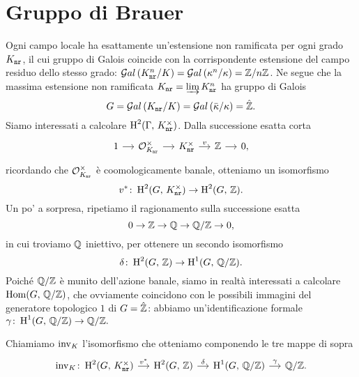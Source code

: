 \section{Gruppo di Brauer}
Ogni campo locale ha esattamente un'estensione non ramificata per ogni grado $ K_\mathtt{nr} $, il cui gruppo di Galois coincide con la corrispondente estensione del campo residuo dello stesso grado: $ \mathcal{G}al\left( K^n_\texttt{nr} / K \right) = \mathcal{G}al\left( \kappa^n / \kappa \right) = \mathbb{Z} / n\mathbb{Z} $. Ne segue che la massima estensione non ramificata $ K_\mathtt{nr} = \varinjlim K^n_\texttt{nr} $ ha gruppo di Galois
\[ G = \mathcal{G}al\left( K_\mathtt{nr} / K \right) = \mathcal{G}al\left( \bar{\kappa} / \kappa \right) = \hat{\mathbb{Z}}. \]
Siamo interessati a calcolare $ \operatorname{H}^2(\Gamma, \, K_\mathtt{nr}^\times) $. Dalla successione esatta corta
\[ \begin{tikzcd}[column sep = small]
1 \rar
& \mathcal{O}_{\knr}^\times \rar
& \knr^\times \rar["v"]
& \Z \rar
& 0,
\end{tikzcd} \]
ricordando che $ \mathcal{O}_{K_\mathtt{nr}}^\times $ è coomologicamente banale, otteniamo un isomorfismo
\[ v^* \colon \operatorname{H}^2(G, \, K_\mathtt{nr}^\times) \to \operatorname{H}^2(G, \, \mathbb{Z}). \]
Un po' a sorpresa, ripetiamo il ragionamento sulla successione esatta
\[ 0 \to \mathbb{Z} \to \mathbb{Q} \to \mathbb{Q}/\mathbb{Z} \to 0, \]
in cui troviamo $ \mathbb{Q} $ iniettivo, per ottenere un secondo isomorfismo
\[ \delta \colon \operatorname{H}^2(G, \, \mathbb{Z}) \to \operatorname{H}^1(G, \, \mathbb{Q}/\mathbb{Z}). \]
Poiché $ \mathbb{Q}/\mathbb{Z} $ è munito dell'azione banale, siamo in realtà interessati a calcolare $ \operatorname{Hom}(G, \, \mathbb{Q}/\mathbb{Z}) $, che ovviamente coincidono con le possibili immagini del generatore topologico $ 1 $ di $ G = \hat{\mathbb{Z}} $: abbiamo un'identificazione formale $ \gamma \colon \operatorname{H}^1(G, \, \mathbb{Q}/\mathbb{Z}) \to \mathbb{Q}/\mathbb{Z}.  $

\begin{definition}
	Chiamiamo $ \operatorname{inv}_K $ l'isomorfismo che otteniamo componendo le tre mappe di sopra
	\[ \begin{tikzcd}[column sep = small]
	\inv_\K \colon \HH^2(G, \, \knr^\times)  \rar["v^*"]
	& \HH^2(G, \, \Z) \rar["\delta"]
	& \HH^1(G, \, \Q/\Z) \rar["\gamma"]
	& \Q/\Z.
	\end{tikzcd} \]
\end{definition}

